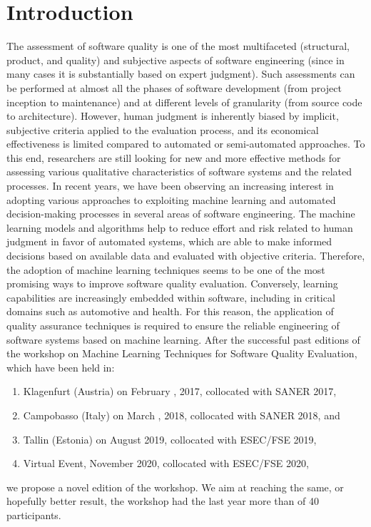 
\section{Introduction}
\label{sec:motivation}

The assessment of software quality is one of the most multifaceted (\eg structural, product, and quality) and subjective aspects of software engineering (since in many cases it is substantially based on expert judgment).
Such assessments can be performed at almost all the phases of software development (from project inception to maintenance) and at different levels of granularity (from source code to architecture).
However, human judgment is inherently biased by implicit, subjective criteria applied to the evaluation process, and its economical effectiveness is limited compared to automated or semi-automated approaches.
To this end, researchers are still looking for new and more effective methods for assessing various qualitative characteristics of software systems and the related processes.
In recent years, we have been observing an increasing interest in adopting various approaches to exploiting machine learning and automated decision-making processes in several areas of software engineering.
The machine learning models and algorithms help to reduce effort and risk related to human judgment in favor of automated systems, which are able to make informed decisions based on available data and evaluated with objective criteria.
Therefore, the adoption of machine learning techniques seems to be one of the most promising ways to improve software quality evaluation.
Conversely, learning capabilities are increasingly embedded within software, including in critical domains such as automotive and health.
For this reason, the application of quality assurance techniques is required to ensure the reliable engineering of software systems based on machine learning.
After the successful past editions of the workshop on Machine Learning Techniques for Software Quality Evaluation, which have been held in:
\begin{enumerate}
    \item Klagenfurt (Austria) on February , 2017, collocated with SANER 2017,
    \item Campobasso (Italy) on March  , 2018, collocated with SANER 2018, and
    \item Tallin (Estonia) on August  2019, collocated with ESEC/FSE 2019,
    \item Virtual Event, November   2020, collocated with ESEC/FSE 2020,
\end{enumerate}
we propose a novel edition of the workshop.
We aim at reaching the same, or hopefully better result, the workshop had the last year more than of 40 participants.
